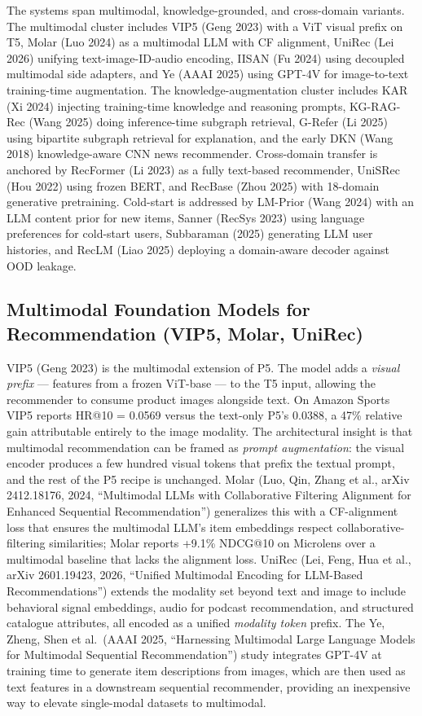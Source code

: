 The systems span multimodal, knowledge-grounded, and cross-domain variants. The multimodal cluster includes VIP5 (Geng 2023) with a ViT visual prefix on T5, Molar (Luo 2024) as a multimodal LLM with CF alignment, UniRec (Lei 2026) unifying text-image-ID-audio encoding, IISAN (Fu 2024) using decoupled multimodal side adapters, and Ye (AAAI 2025) using GPT-4V for image-to-text training-time augmentation. The knowledge-augmentation cluster includes KAR (Xi 2024) injecting training-time knowledge and reasoning prompts, KG-RAG-Rec (Wang 2025) doing inference-time subgraph retrieval, G-Refer (Li 2025) using bipartite subgraph retrieval for explanation, and the early DKN (Wang 2018) knowledge-aware CNN news recommender. Cross-domain transfer is anchored by RecFormer (Li 2023) as a fully text-based recommender, UniSRec (Hou 2022) using frozen BERT, and RecBase (Zhou 2025) with 18-domain generative pretraining. Cold-start is addressed by LM-Prior (Wang 2024) with an LLM content prior for new items, Sanner (RecSys 2023) using language preferences for cold-start users, Subbaraman (2025) generating LLM user histories, and RecLM (Liao 2025) deploying a domain-aware decoder against OOD leakage.

\subsection{Multimodal Foundation Models for Recommendation (VIP5, Molar, UniRec)}\label{multimodal-foundation-models-for-recommendation-vip5-molar-unirec}

VIP5 (Geng 2023) is the multimodal extension of P5. The model adds a \emph{visual prefix} --- features from a frozen ViT-base --- to the T5 input, allowing the recommender to consume product images alongside text. On Amazon Sports VIP5 reports HR@10 = 0.0569 versus the text-only P5's 0.0388, a 47\% relative gain attributable entirely to the image modality. The architectural insight is that multimodal recommendation can be framed as \emph{prompt augmentation}: the visual encoder produces a few hundred visual tokens that prefix the textual prompt, and the rest of the P5 recipe is unchanged. Molar (Luo, Qin, Zhang et al., arXiv 2412.18176, 2024, ``Multimodal LLMs with Collaborative Filtering Alignment for Enhanced Sequential Recommendation'') generalizes this with a CF-alignment loss that ensures the multimodal LLM's item embeddings respect collaborative-filtering similarities; Molar reports +9.1\% NDCG@10 on Microlens over a multimodal baseline that lacks the alignment loss. UniRec (Lei, Feng, Hua et al., arXiv 2601.19423, 2026, ``Unified Multimodal Encoding for LLM-Based Recommendations'') extends the modality set beyond text and image to include behavioral signal embeddings, audio for podcast recommendation, and structured catalogue attributes, all encoded as a unified \emph{modality token} prefix. The Ye, Zheng, Shen et al.~(AAAI 2025, ``Harnessing Multimodal Large Language Models for Multimodal Sequential Recommendation'') study integrates GPT-4V at training time to generate item descriptions from images, which are then used as text features in a downstream sequential recommender, providing an inexpensive way to elevate single-modal datasets to multimodal.


